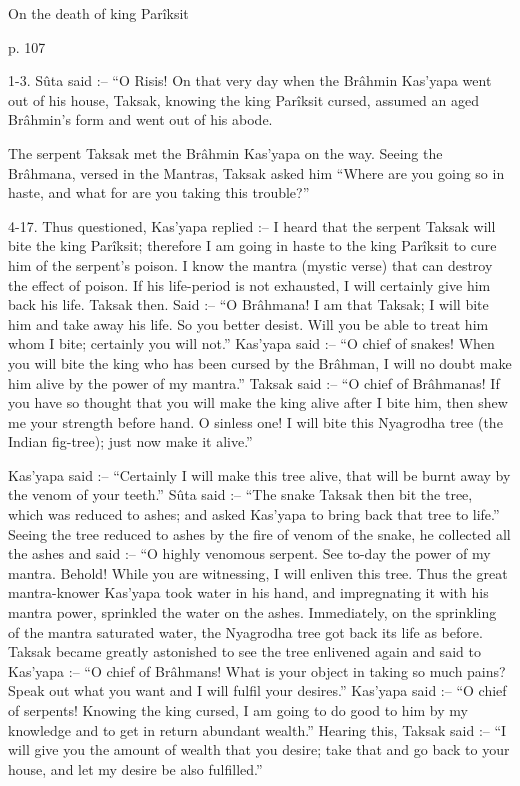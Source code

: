 ﻿On the death of king Parîksit

 

p. 107

 

1-3. Sûta said :-- “O Risis! On that very day when the Brâhmin Kas'yapa went out of his house, Taksak, knowing the king Parîksit cursed, assumed an aged Brâhmin's form and went out of his abode.

 

 

The serpent Taksak met the Brâhmin Kas'yapa on the way. Seeing the Brâhmana, versed in the Mantras, Taksak asked him “Where are you going so in haste, and what for are you taking this trouble?”

 

4-17. Thus questioned, Kas'yapa replied :-- I heard that the serpent Taksak will bite the king Parîksit; therefore I am going in haste to the king Parîksit to cure him of the serpent's poison. I know the mantra (mystic verse) that can destroy the effect of poison. If his life-period is not exhausted, I will certainly give him back his life. Taksak then. Said :-- “O Brâhmana! I am that Taksak; I will bite him and take away his life. So you better desist. Will you be able to treat him whom I bite; certainly you will not.” Kas'yapa said :-- “O chief of snakes! When you will bite the king who has been cursed by the Brâhman, I will no doubt make him alive by the power of my mantra.” Taksak said :-- “O chief of Brâhmanas! If you have so thought that you will make the king alive after I bite him, then shew me your strength before hand. O sinless one! I will bite this Nyagrodha tree (the Indian fig-tree); just now make it alive.”

 

Kas'yapa said :-- “Certainly I will make this tree alive, that will be burnt away by the venom of your teeth.” Sûta said :-- “The snake Taksak then bit the tree, which was reduced to ashes; and asked Kas'yapa to bring back that tree to life.” Seeing the tree reduced to ashes by the fire of venom of the snake, he collected all the ashes and said :-- “O highly venomous serpent. See to-day the power of my mantra. Behold! While you are witnessing, I will enliven this tree. Thus the great mantra-knower Kas'yapa took water in his hand, and impregnating it with his mantra power, sprinkled the water on the ashes. Immediately, on the sprinkling of the mantra saturated water, the Nyagrodha tree got back its life as before. Taksak became greatly astonished to see the tree enlivened again and said to Kas'yapa :-- “O chief of Brâhmans! What is your object in taking so much pains? Speak out what you want and I will fulfil your desires.” Kas'yapa said :-- “O chief of serpents! Knowing the king cursed, I am going to do good to him by my knowledge and to get in return abundant wealth.” Hearing this, Taksak said :-- “I will give you the amount of wealth that you desire; take that and go back to your house, and let my desire be also fulfilled.”

